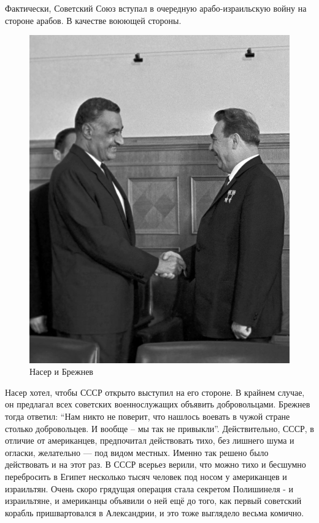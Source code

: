 Фактически, Советский Союз вступал в очередную арабо-израильскую войну на стороне арабов. В качестве воюющей стороны.

\begin{figure}[h!tb] 
	\centering\includegraphics[scale=0.4]{Dolina_1/Zbp75LzED2Y.jpg}
	\caption{Насер и Брежнев}%
\end{figure}

Насер хотел, чтобы СССР открыто выступил на его стороне. В крайнем случае, он предлагал всех советских военнослужащих объявить добровольцами. Брежнев тогда ответил: “Нам никто не поверит, что нашлось воевать в чужой стране столько добровольцев. И вообще – мы так не привыкли”. Действительно, СССР, в отличие от американцев, предпочитал действовать тихо, без лишнего шума и огласки, желательно — под видом местных. Именно так решено было действовать и на этот раз. В СССР всерьез верили, что можно тихо и бесшумно перебросить в Египет несколько тысяч человек под носом у американцев и израильтян. Очень скоро грядущая операция стала секретом Полишинеля - и израильтяне, и американцы объявили о ней ещё до того, как первый советский корабль пришвартовался в Александрии, и это тоже выглядело весьма комично.

